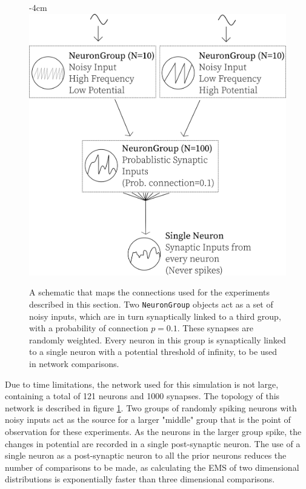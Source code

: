 \begin{figure}[h!]
    \centering
    \addtolength{\leftskip} {-4cm}
    \addtolength{\rightskip}{-4cm}
    \includegraphics[width=0.6\linewidth]{figures/tops/ExperimentLayout.png}
    \caption[Example Network Setup]{A schematic that maps the connections used for the experiments described in this section. Two \texttt{NeuronGroup} objects act as a set of noisy inputs, which are in turn synaptically linked to a third group, with a probability of connection $p=0.1$. These synapses are randomly weighted. Every neuron in this group is synaptically linked to a single neuron with a potential threshold of infinity, to be used in network comparisons.}
    \label{fig:RES1TOP}
\end{figure}
\FloatBarrier

Due to time limitations, the network used for this simulation is not large,
containing a total of 121 neurons and 1000 synapses. The topology of this
network is described in figure \ref{fig:RES1TOP}. Two groups of randomly spiking
neurons with noisy inputs act as the source for a larger "middle" group that is
the point of observation for these experiments. As the neurons in the larger
group spike, the changes in potential are recorded in a single post-synaptic
neuron. The use of a single neuron as a post-synaptic neuron to all the prior
neurons reduces the number of comparisons to be made, as calculating the EMS of
two dimensional distributions is exponentially faster than three dimensional
comparisons. 


